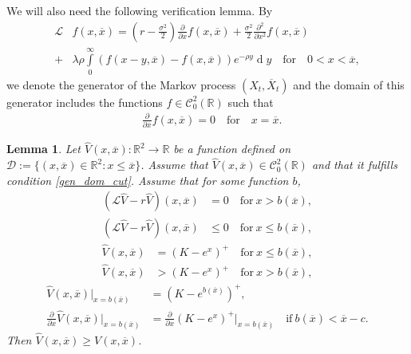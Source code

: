 \documentclass[10pt]{amsart}
\newcommand{\dx}{\operatorname{d}\!}
\newtheorem{Lemma}{Lemma}
\begin{document}
	We will also need the following verification lemma.
	By
	\begin{align*}
		\mathcal{L}&f(x, \overline{x}) = \left(r - \frac{\sigma^2}{2}\right) \frac{\partial}{\partial x} f(x, \overline{x}) +  \frac{\sigma^2}{2}\frac{\partial^2}{\partial x^2} f(x, \overline{x})  \\
		+ & \lambda\rho\int\limits_0^\infty \left( f(x-y, \overline{x}) - f(x, \overline{x}) \right) e^{-\rho y}\dx y \quad \text{for}\quad 0 < x < \overline{x},
	\end{align*}
	we denote the generator of the Markov process $(X_t, \overline{X}_t)$
and the domain of this generator includes the functions $f\in \mathcal{C}^2_0(\mathbb{R})$ such that
	\begin{align}
		& \frac{\partial}{\partial \overline{x}} f(x, \overline{x})  =  0  \quad \text{for}\quad  x = \overline{x}. \label{gen_dom_cut}
	\end{align}	
	\begin{Lemma}\label{HJB}
		Let $\hat{V}(x, \overline{x}): \mathbb{R}^2 \rightarrow \mathbb{R}$ be a function defined on $\mathcal{D} := \{ (x, \overline{x}) \in \mathbb{R}^2 : x \leq \overline{x}\}$.
		Assume that $\hat{V}(x, \overline{x}) \in \mathcal{C}^2_0(\mathbb{R})$ and that it fulfills condition \eqref{gen_dom_cut}.
		Assume that for some function $b$,
		\begin{align}
			(\mathcal{L} \hat{V} - r\hat{V})(x, \overline{x}) &= 0\quad \text{for}\ x> b(\overline{x}), \label{HJB1} \\
			(\mathcal{L} \hat{V} - r\hat{V})(x, \overline{x}) &\leq 0\quad \text{for}\ x\leq  b(\overline{x}),\label{HJB1b}
		\end{align}
		\begin{align}
			\hat{V}(x, \overline{x}) &= (K - e^x)^+\quad \text{for}\ x \leq b(\overline{x}), \label{HJB3}\\
			\hat{V}(x, \overline{x}) &> (K - e^x)^+\quad \text{for}\ x> b(\overline{x}), \label{HJB4}
		\end{align}
		\begin{align}
			\hat{V}(x, \overline{x}) \big|_{x = b(\overline{x})} &= (K - e^{b(\overline{x})})^+, \label{HJB6}  \\
			\frac{\partial}{\partial x} \hat{V}(x, \overline{x}) \big|_{x = b(\overline{x})} &= \frac{\partial}{\partial x} (K - e^x)^+ \big|_{x = b(\overline{x})} \quad \text{if}\ b(\overline{x})<\overline{x}-c.\label{HJB7}
		\end{align}
		Then $\hat{V}(x, \overline{x})\geq V(x, \overline{x})$.
	\end{Lemma}
\end{document}
